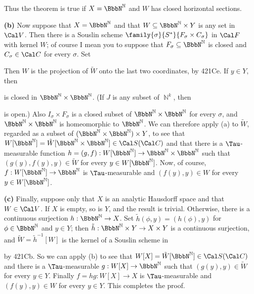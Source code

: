 {Thus the theorem is true if $X=\NN$ and $W$ has closed horizontal
sections.

\medskip

{\bf (b)} Now suppose that $X=\NN$ and that $W\subseteq\NN\times Y$ is
any set in $\Cal V$.   Then there is a Souslin scheme
$\family{\sigma}{S^*}{F_{\sigma}\times C_{\sigma}}$ in $\Cal F$ with
kernel $W$;  of course I mean you to suppose that
$F_{\sigma}\subseteq\NN$ is closed and $C_{\sigma}\in\Cal C$ for every
$\sigma$.   Set


\noindent Then $W$ is the projection of $\tilde W$ onto the last two
coordinates, by 421Ce.   If $y\in Y$, then


\noindent is closed in $\NN\times\NN$.   (If $J$ is any subset of
$\BbbN^k$, then


\noindent is open.)   Also $I_{\sigma}\times F_{\sigma}$ is a closed
subset of $\NN\times\NN$ for every $\sigma$, and $\NN\times\NN$ is
homeomorphic to $\NN$.   We can therefore apply (a) to $\tilde W$,
regarded as a subset of $(\NN\times\NN)\times Y$, to see that
$W[\NN]=\tilde W[\NN\times\NN]\in\Cal S(\Cal C)$ and that there is a
$\Tau$-measurable function $h=(g,f):W[\NN]\to\NN\times\NN$ such that
$(g(y),f(y),y)\in\tilde W$ for every $y\in W[\NN]$.   Now, of course,
$f:W[\NN]\to\NN$ is $\Tau$-measurable and $(f(y),y)\in W$ for every
$y\in W[\NN]$.

\medskip

{\bf (c)} Finally, suppose only that $X$ is an analytic Hausdorff space
and that $W\in\Cal V$.   If $X$ is empty, so is
$Y$, and the result is trivial.   Otherwise, there is a continuous
surjection $h:\NN\to X$.   Set $\tilde h(\phi,y)=(h(\phi),y)$ for
$\phi\in\NN$ and
$y\in Y$;  then $\tilde h:\NN\times Y\to X\times Y$ is a continuous
surjection, and $\tilde W=\tilde h^{-1}[W]$ is the kernel of a Souslin
scheme in


\noindent by 421Cb.   So we can apply (b) to see that
$W[X]=\tilde W[\NN]\in\Cal S(\Cal C)$ and there is a
$\Tau$-measurable $g:W[X]\to\NN$ such that $(g(y),y)\in\tilde W$ for
every $y\in Y$.   Finally $f=hg:W[X]\to X$ is $\Tau$-measurable and
$(f(y),y)\in W$ for every $y\in Y$.   This completes the proof.
}%

